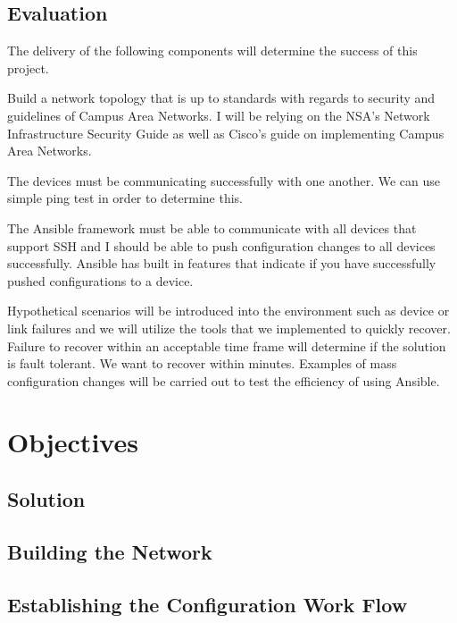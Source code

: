 \documentclass[12pt, letterpaper]{article}
\begin{document}
	\subsection{Evaluation}
The delivery of the following components will determine the success of this project.

\smallskip

Build a network topology that is up to standards with regards to security and guidelines of Campus Area Networks. I will be relying on the NSA’s Network Infrastructure Security Guide as well as Cisco’s guide on implementing Campus Area Networks. 

\smallskip

The devices must be communicating successfully with one another. We can use simple ping test in order to determine this. 

\smallskip

The Ansible framework must be able to communicate with all devices that support SSH and I should be able to push configuration changes to all devices successfully. Ansible has built in features that indicate if you have successfully pushed configurations to a device. 

\smallskip

Hypothetical scenarios will be introduced into the environment such as device or link failures and we will utilize the tools that we implemented to quickly recover. Failure to recover within an acceptable time frame will determine if the solution is fault tolerant. We want to recover within minutes. Examples of mass configuration changes will be carried out to test the efficiency of using Ansible. 


\newpage

\section{Objectives}

	\subsection{Solution}

	\subsection{Building the Network}
		
	\subsection{Establishing the Configuration Work Flow}
\end{document}
